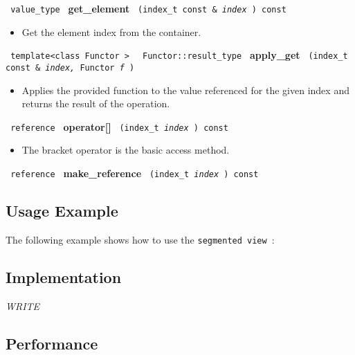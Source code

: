 \noindent
\texttt{%
value\_type
}
\newline
\textbf{get\_element}%
\texttt{%
(index\_t const \&
\textit{index}%
) const
}

\begin{itemize}
\item
Get the element index from the container.
\end{itemize}

\noindent
\texttt{%
template<class Functor >
}
\texttt{%
Functor::result\_type
}
\newline
\textbf{apply\_get}%
\texttt{%
(index\_t const \&
\textit{index,}%
Functor
\textit{f}%
)
}

\begin{itemize}
\item
Applies the provided function to the value referenced for the given index and returns the result of the operation.
\end{itemize}

\noindent
\texttt{%
reference
}
\newline
\textbf{operator[]}%
\texttt{%
(index\_t
\textit{index}%
) const
}

\begin{itemize}
\item
The bracket operator is the basic access method.
\end{itemize}

\noindent
\texttt{%
reference
}
\newline
\textbf{make\_reference}%
\texttt{%
(index\_t
\textit{index}%
) const
}

\subsection{Usage Example} \label{sec-seg-vw-use}

The following example shows how to use the \texttt{segmented view }:


\subsection{Implementation} \label{sec-seg-vw-impl}

\textit{WRITE}

\subsection{Performance} \label{sec-seg-vw-perf}

